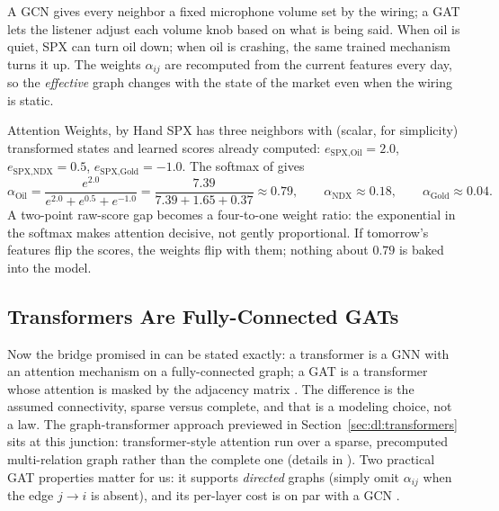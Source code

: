 \begin{intuition}
A GCN gives every neighbor a fixed microphone volume set by the wiring; a GAT lets the listener adjust each volume knob based on what is being said. When oil is quiet, SPX can turn oil down; when oil is crashing, the same trained mechanism turns it up. The weights $\alpha_{ij}$ are recomputed from the current features every day, so the \emph{effective} graph changes with the state of the market even when the wiring is static.
\end{intuition}

\begin{workedexample}{Attention Weights, by Hand}
SPX has three neighbors with (scalar, for simplicity) transformed states and learned scores already computed: $e_{\text{SPX,Oil}} = 2.0$, $e_{\text{SPX,NDX}} = 0.5$, $e_{\text{SPX,Gold}} = -1.0$. The softmax of  gives
\[
\alpha_{\text{Oil}} = \frac{e^{2.0}}{e^{2.0} + e^{0.5} + e^{-1.0}} = \frac{7.39}{7.39 + 1.65 + 0.37} \approx 0.79,
\qquad
\alpha_{\text{NDX}} \approx 0.18, \qquad \alpha_{\text{Gold}} \approx 0.04.
\]
A two-point raw-score gap becomes a four-to-one weight ratio: the exponential in the softmax makes attention decisive, not gently proportional. If tomorrow's features flip the scores, the weights flip with them; nothing about $0.79$ is baked into the model.
\end{workedexample}

\subsection{Transformers Are Fully-Connected GATs}\label{sec:gnn:transformers-gnn}

Now the bridge promised in  can be stated exactly: a transformer is a GNN with an attention mechanism on a fully-connected graph; a GAT is a transformer whose attention is masked by the adjacency matrix \citep{SanchezLengeling2021}. The difference is the assumed connectivity, sparse versus complete, and that is a modeling choice, not a law. The graph-transformer approach previewed in Section~\ref{sec:dl:transformers} \citep{ChenRobert2022} sits at this junction: transformer-style attention run over a sparse, precomputed multi-relation graph rather than the complete one (details in ). Two practical GAT properties matter for us: it supports \emph{directed} graphs (simply omit $\alpha_{ij}$ when the edge $j \to i$ is absent), and its per-layer cost is on par with a GCN \citep[pp.~4--5]{Velickovic2018GAT}.

